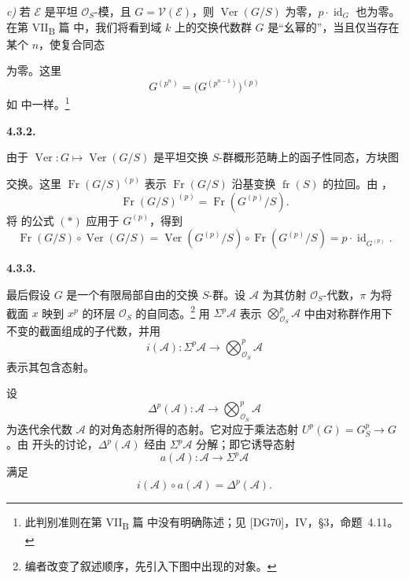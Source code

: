 \smallskip
\noindent\textit{c)}
若 \(\mathcal E\) 是平坦 \(\mathcal O_S\)-模，且 \(G=\mathcal V(\mathcal E)\)，则 \(\operatorname{Ver}(G/S)\) 为零，\(p\cdot\operatorname{id}_G\) 也为零。在第 VII\textsubscript{B} 篇 中，我们将看到域 \(k\) 上的交换代数群 \(G\) 是“幺幂的”，当且仅当存在某个 \(n\)，使复合同态
\begin{center}
  \label{sga3:VIIA:4.3.1-iterated-verschiebung-chain}
  
\end{center}
为零。这里
\[
  G^{(p^n)}
  =
  \bigl(G^{(p^{n-1})}\bigr)^{(p)}
\]
如  中一样。\footnote{此判别准则在第 VII\textsubscript{B} 篇 中没有明确陈述；见 \textup{[DG70]}，IV，\S3，命题~4.11。}

\medskip
\noindent\textbf{4.3.2.}
\label{sga3:VIIA:4.3.2}

由于 \(\operatorname{Ver}:G\mapsto\operatorname{Ver}(G/S)\) 是平坦交换 \(S\)-群概形范畴上的函子性同态，方块图
\begin{center}
  \label{sga3:VIIA:4.3.2-frobenius-verschiebung-square}
  
\end{center}
交换。这里 \(\operatorname{Fr}(G/S)^{(p)}\) 表示 \(\operatorname{Fr}(G/S)\) 沿基变换 \(\operatorname{fr}(S)\) 的拉回。由 ，
\[
  \operatorname{Fr}(G/S)^{(p)}
  =
  \operatorname{Fr}(G^{(p)}/S).
\]
将  的公式 \((*)\) 应用于 \(G^{(p)}\)，得到
\[
  \tag{**}\label{sga3:vii:paragraph:4-3-2:equation:double-star}
  \operatorname{Fr}(G/S)\circ\operatorname{Ver}(G/S)
  =
  \operatorname{Ver}(G^{(p)}/S)
    \circ\operatorname{Fr}(G^{(p)}/S)
  =
  p\cdot\operatorname{id}_{G^{(p)}}.
\]

\medskip
\noindent\textbf{4.3.3.}
\label{sga3:VIIA:4.3.3}

最后假设 \(G\) 是一个有限局部自由的交换 \(S\)-群。设 \(\mathcal A\) 为其仿射 \(\mathcal O_S\)-代数，\(\pi\) 为将截面 \(x\) 映到 \(x^p\) 的环层 \(\mathcal O_S\) 的自同态。\footnote{编者改变了叙述顺序，先引入下图中出现的对象。}
用 \(\Sigma^p\mathcal A\) 表示 \(\bigotimes_{\mathcal O_S}^p\mathcal A\) 中由对称群作用下不变的截面组成的子代数，并用
\[
  i(\mathcal A):
  \Sigma^p\mathcal A
  \longrightarrow
  \bigotimes_{\mathcal O_S}^p\mathcal A
\]
表示其包含态射。

设
\[
  \Delta^p(\mathcal A):
  \mathcal A
  \longrightarrow
  \bigotimes_{\mathcal O_S}^p\mathcal A
\]
为迭代余代数 \(\mathcal A\) 的对角态射所得的态射。它对应于乘法态射 \(U^p(G)=G_S^p\to G\)。由  开头的讨论，\(\Delta^p(\mathcal A)\) 经由 \(\Sigma^p\mathcal A\) 分解；即它诱导态射
\[
  a(\mathcal A):
  \mathcal A\longrightarrow\Sigma^p\mathcal A
\]
满足
\[
  i(\mathcal A)\circ a(\mathcal A)
  =
  \Delta^p(\mathcal A).
\]

